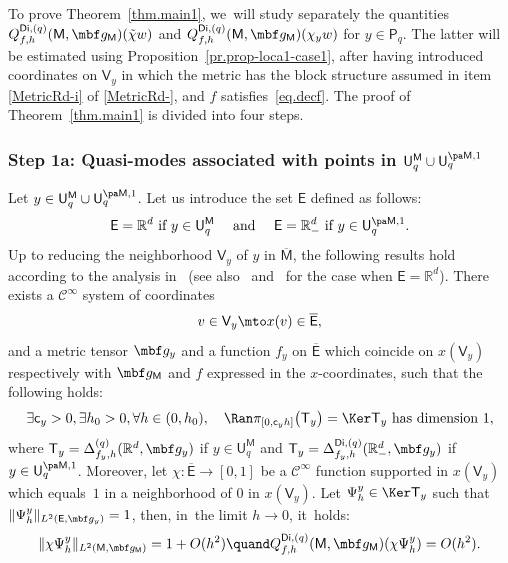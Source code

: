 To prove Theorem~\ref{thm.main1}, we~will study separately the quantities $Q_{f,h}^{\mathsf{Di},(q)}(\mathsf M,\mbf g_{\mathsf M})(\tilde \chi w)$ and $Q_{f,h}^{\mathsf{Di},(q)}(\mathsf M,\mbf g_{\mathsf M})(\chi_y w)$ for $y\in \mathsf P_q$.
The latter will be estimated using
Proposition~\ref{pr.prop-loca1-case1}, after having introduced
coordinates on $\mathsf V_y$ in which the metric has the block structure
assumed in item \eqref{MetricRd-i} of \ref{MetricRd-}, and $f$ satisfies~\eqref{eq.decf}. The proof of Theorem~\ref{thm.main1} is divided into four steps.


\subsubsection*{Step 1a: Quasi-modes associated with points in $ \mathsf
U_q^{\mathsf M}\cup \mathsf U^{\pa \mathsf M,1}_q$} Let $y\in
\mathsf U_q^{\mathsf M}\cup \mathsf U^{\pa \mathsf M,1}_q$. Let us
introduce the set $\mathsf E$ defined as follows:\vspace*{-3pt}
\[
\text{$\mathsf E=\mathbb R^d$ if $ y\in \mathsf U_q^{\mathsf
M} \quad$ and $\quad\mathsf E=\mathbb R^d_-$ if $y\in \mathsf U^{\pa \mathsf
M,1}_q$.}
\]
Up to reducing the neighborhood $\mathsf V_y$ of $y$ in $\overline{\mathsf M}$, the following results hold according to the analysis in~\cite[Chap.\,3]{helffer-nier-06} (see also~\cite{helffer-sjostrand-85} and~\cite{HKN} for the case when $\mathsf E=\mathbb R^d$). There exists a $\mathcal C^\infty$ system of coordinates\vspace*{-3pt}
\[
v\in \mathsf V_y\mto x(v) \in \overline{\mathsf E},
\]
and a metric tensor $\mbf g_y$ and a function $f_y$ on $
\overline{\mathsf E}$ which coincide on $x(\mathsf V_y)$ respectively with $\mbf
g_{\mathsf M}$ and $f$ expressed in the $x$-coordinates,
such that the following holds:\vspace*{-3pt}
\begin{equation}\label{eq.span=12}
\exists \mathsf c_y>0, \exists h_0 >0, \forall h \in (0,h_0),\quad \Ran \pi_{[0,\mathsf c_yh]}\bigl(\mathsf T_y \bigr)=\Ker \mathsf T_y \text{ has dimension } 1,
\end{equation}
where $\mathsf T_y=\Delta_{f_y,h}^{(q)}(\mathbb R^d,\mbf g_y)$ if
$y\in \mathsf U_q^{\mathsf
M}$ and $\mathsf T_y=\Delta_{f_y,h}^{\mathsf{Di},(q)}(\mathbb R^d_-,\mbf g_y)$ if $y\in \mathsf U^{\pa \mathsf
M,1}_q$.
Moreover, let $\chi: \overline{\mathsf E} \to [0,1]$ be a $\mathcal C^\infty$ function supported in $x(\mathsf V_y)$ which equals~$1$ in a neighborhood of $0$ in $x(\mathsf V_y)$.
Let $\Psi_h^y\in \Ker\mathsf T_y$ such that $ \Vert \Psi_h^y\Vert_{L^2(\mathsf E,\mbf g_y)}=1$, then, in~the limit $h\to 0$, it~holds:
\begin{equation}\label{eq.omega-z2}
\Vert \chi \Psi_h^y \Vert_{L^2(\mathsf M,\mbf g_{\mathsf M})} =1+O (h^{2}) \quand Q_{f,h}^{\mathsf{Di},(q)}(\mathsf M,\mbf g_{\mathsf M})(\chi \Psi_h^y)=O(h^2).
\end{equation}

